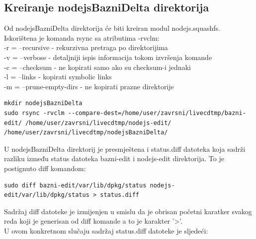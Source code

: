 \documentclass[12pt,vi]{mitthesis}
\begin{document}
\subsection*{Kreiranje nodejsBazniDelta direktorija}
\indent
Od nodejsBazniDelta direktorija će biti kreiran modul nodejs.squashfs.\\
Iskorištena je komanda rsync sa atributima -rvclm:\\
-r = --recursive - rekurzivna pretraga po direktorijima\\
-v = --verbose - detaljniji ispis informacija tokom izvršenja komande\\
-c = --checksum - ne kopirati samo ako su checksum-i jednaki\\
-l = --links - kopirati symbolic links\\
-m = --prune-empty-dirs - ne kopirati prazne direktorije\\
\begin{lstlisting}[style=BashInputStyle]
mkdir nodejsBazniDelta
sudo rsync -rvclm --compare-dest=/home/user/zavrsni/livecdtmp/bazni-edit/ /home/user/zavrsni/livecdtmp/nodejs-edit/ /home/user/zavrsni/livecdtmp/nodejsBazniDelta/
\end{lstlisting}
\indent
U nodejsBazniDelta direktorij je presmještena i status.diff datoteka koja sadrži razliku između status datoteka bazni-edit i nodejs-edit direktorija. To je postignuto diff komandom:
\begin{lstlisting}[style=BashInputStyle]
sudo diff bazni-edit/var/lib/dpkg/status nodejs-edit/var/lib/dpkg/status > status.diff
\end{lstlisting}
Sadržaj diff datoteke je izmijenjen u smislu da je obrisan početni karatker svakog reda koji je generisan od diff komande a to je karakter '>'.\\
U ovom konkretnom slučaju sadržaj status.diff datoteke je sljedeći:
\end{document}
